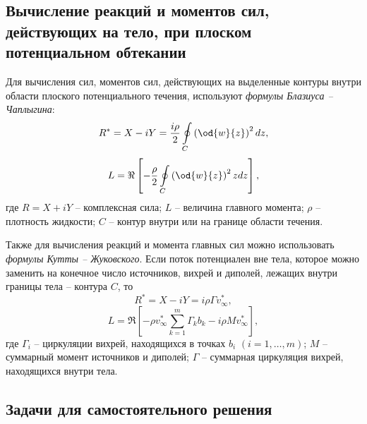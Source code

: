 \documentclass[14pt]{extarticle}
\begin{document}
\subsection{Вычисление реакций и моментов сил, действующих на тело, при плоском потенциальном обтекании}
	

			
Для вычисления сил, моментов сил, действующих на выделенные контуры внутри области плоского потенциального течения, используют \textit{формулы Блазиуса -- Чаплыгина}:
\[
R^* = X - i Y = \frac{i\rho}{2} \oint\limits_C \left(\od{w}{z} \right)^2 dz,
\]	
\[
L = \Re \left[
-\frac{\rho}{2}\oint\limits_C \left(\od{w}{z} \right)^2 zdz
\right],
\]
где $R=X+i Y$ -- комплексная сила; $L$ -- величина главного момента; $\rho$ -- плотность жидкости; $C$ -- контур внутри или на границе области течения.

Также для вычисления реакций и момента главных сил можно использовать \textit{формулы Кутты -- Жуковского}. Если поток потенциален вне тела, которое можно заменить на конечное число источников, вихрей и диполей, лежащих внутри границы тела -- контура $C$, то
\[
R^* =  X - iY = i\rho\Gamma v_\infty^*,		
\]
\[
L = \Re \left[
-\rho v_\infty^*\sum\limits_{k=1}^m\Gamma_kb_k-i\rho M v_\infty^*
\right],
\]
где
$\Gamma_i$ -- циркуляции вихрей, находящихся в точках $b_i$ $(i=1,\ldots,m)$; $M$ -- суммарный момент источников и диполей; $\Gamma$ -- суммарная циркуляция вихрей, находящихся внутри тела.



\subsection{Задачи для самостоятельного решения}
\end{document}
